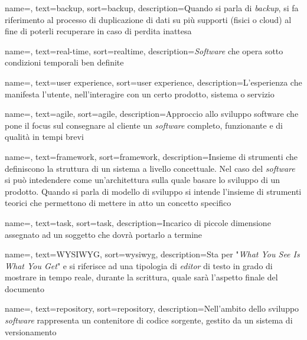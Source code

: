 {
    name=,
    text=backup,
    sort=backup,
    description={Quando si parla di \textit{backup}, si fa riferimento al processo di duplicazione di dati su più supporti (fisici o cloud) al fine di poterli recuperare in caso di perdita inattesa}
}

{
    name=,
    text=real-time,
    sort=realtime,
    description={\textit{Software} che opera sotto condizioni temporali ben definite}
}

{
    name=,
    text=user experience,
    sort=user experience,
    description={L'esperienza che manifesta l'utente, nell'interagire con un certo prodotto, sistema o servizio}
}

{
    name=,
    text=agile,
    sort=agile,
    description={Approccio allo sviluppo software che pone il focus sul consegnare al cliente un \textit{software} completo, funzionante  e di qualità in tempi brevi}
}

{
    name=,
    text=framework,
    sort=framework,
    description={Insieme di strumenti che definiscono la struttura di un sistema a livello concettuale. Nel caso del \textit{software} si può intedendere come un'architettura sulla quale basare lo sviluppo di un prodotto. Quando si parla di modello di sviluppo si intende l'insieme di strumenti teorici che permettono di mettere in atto un concetto specifico}
}

{
    name=,
    text=task,
    sort=task,
    description={Incarico di piccole dimensione assegnato ad un soggetto che dovrà portarlo a termine}
}

{
    name=,
    text=WYSIWYG,
    sort=wysiwyg,
    description={Sta per "\textit{What You See Is What You Get}" e si riferisce ad una tipologia di \textit{editor} di testo in grado di mostrare in tempo reale, durante la scrittura, quale sarà l'aspetto finale del documento}
}

{
    name=,
    text=repository,
    sort=repository,
    description={Nell'ambito dello sviluppo \textit{software} rappresenta un contenitore di codice sorgente, gestito da un sistema di versionamento}
}

